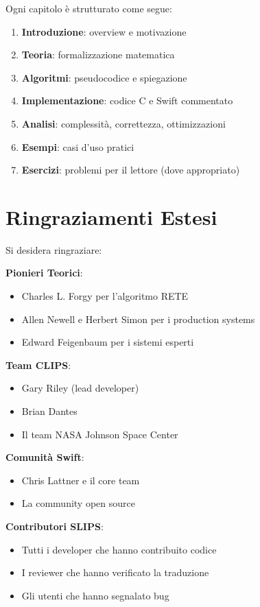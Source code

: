 Ogni capitolo è strutturato come segue:

\begin{enumerate}
\item \textbf{Introduzione}: overview e motivazione
\item \textbf{Teoria}: formalizzazione matematica
\item \textbf{Algoritmi}: pseudocodice e spiegazione
\item \textbf{Implementazione}: codice C e Swift commentato
\item \textbf{Analisi}: complessità, correttezza, ottimizzazioni
\item \textbf{Esempi}: casi d'uso pratici
\item \textbf{Esercizi}: problemi per il lettore (dove appropriato)
\end{enumerate}

\section{Ringraziamenti Estesi}

Si desidera ringraziare:

\textbf{Pionieri Teorici}:
\begin{itemize}
\item Charles L. Forgy per l'algoritmo RETE
\item Allen Newell e Herbert Simon per i production systems
\item Edward Feigenbaum per i sistemi esperti
\end{itemize}

\textbf{Team CLIPS}:
\begin{itemize}
\item Gary Riley (lead developer)
\item Brian Dantes
\item Il team NASA Johnson Space Center
\end{itemize}

\textbf{Comunità Swift}:
\begin{itemize}
\item Chris Lattner e il core team
\item La community open source
\end{itemize}

\textbf{Contributori SLIPS}:
\begin{itemize}
\item Tutti i developer che hanno contribuito codice
\item I reviewer che hanno verificato la traduzione
\item Gli utenti che hanno segnalato bug
\end{itemize}

